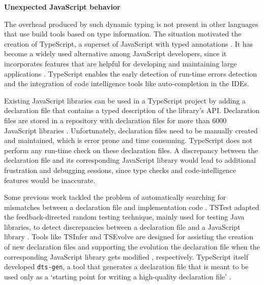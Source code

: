 \begin{code}
	\captionsetup{aboveskip=0pt, belowskip=10pt}
	\caption[Unexpected JavaScript behavior]{\textbf{Unexpected JavaScript behavior}}
	\label{code:introduction-javascript-wtfs}
  \end{code}

The overhead produced by such dynamic typing is not present in other languages that use build tools based on type information. The situation motivated the creation of TypeScript, a superset of JavaScript with typed annotations \citep{typescript}. It has become a widely used alternative among JavaScript developers, since it incorporates features that are helpful for developing and maintaining large applications \citep{DBLP:conf/icse/GaoBB17}. TypeScript enables the early detection of run-time errors detection and the integration of code intelligence tools like auto-completion in the IDEs.

Existing JavaScript libraries can be used in a TypeScript project by adding a declaration file that contains a typed description of the library's API. Declaration files are stored in a repository with declaration files for more than 6000 JavaScript libraries \citep{definitely-typed-repository}. Unfortunately, declaration files need to be manually created and maintained, which is error prone and time consuming. TypeScript does not perform any run-time check on these declaration files. A discrepancy between the declaration file and its corresponding JavaScript library would lead to additional frustration and debugging sessions, since type checks and code-intelligence features would be inaccurate.

Some previous work tackled the problem of automatically searching for mismatches between a declaration file and implementation code \citep{DBLP:conf/oopsla/FeldthausM14}. TSTest adapted the feedback-directed random testing technique, mainly used for testing Java libraries, to detect discrepancies between a declaration file and a JavaScript library \citep{DBLP:journals/pacmpl/KristensenM17}. Tools like TSInfer and TSEvolve are designed for assisting the creation of new declaration files and supporting the evolution the declaration file when the corresponding JavaScript library gets modified \citep{DBLP:conf/fase/KristensenM17}, respectively. TypeScript itself developed \texttt{dts-gen}, a tool that generates a declaration file that is meant to be used only as a `starting point for writing a high-quality declaration file' \citep{dts-gen}.

